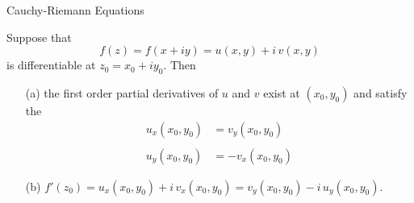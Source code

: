 \vspace*{1em}

\begin{mdframed}
\begin{center}
{\Large Cauchy-Riemann Equations}
\end{center}
\end{mdframed}

%
%
\begin{theorem}\label{crequations}
Suppose that 
\[f(z) = f(x + iy) = u(x,y) + i\,v(x,y)\]
is differentiable at $z_0 = x_0 + iy_0$. Then
\begin{itemize}
\item[(a)] the first order partial derivatives of $u$ and $v$ exist at $(x_0,y_0)$ and satisfy the 
\begin{align*}\label{creqex}
u_x(x_0,y_0) &= v_y(x_0,y_0)\\[-0.5em]
\tag{CR}\\[-0.5em]
u_y(x_0,y_0) &= -v_x(x_0,y_0)
\end{align*}
\item[(b)] $f'(z_0) = u_x(x_0,y_0) + i\,v_x(x_0,y_0) = v_y(x_0,y_0) - i\,u_y(x_0,y_0)$.
\end{itemize}
\end{theorem}
